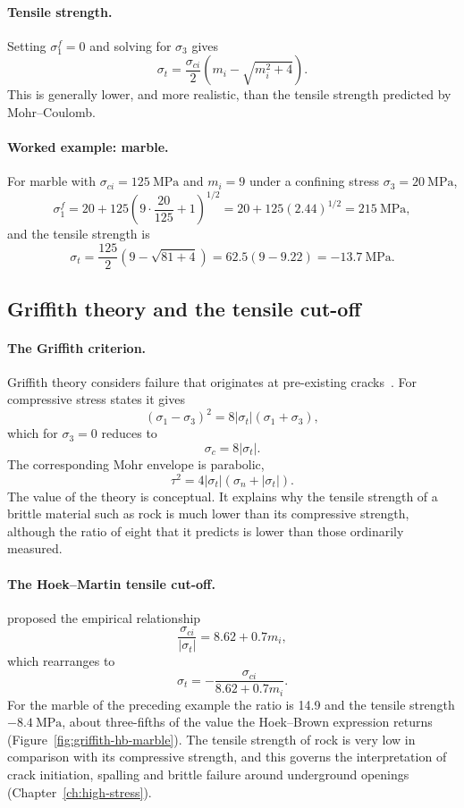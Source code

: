\paragraph{Tensile strength.}
Setting \(\sigma_1^f = 0\) and solving for \(\sigma_3\) gives
\[
\sigma_t =
\frac{\sigma_{ci}}{2}
\left(
m_i - \sqrt{m_i^2+4}
\right) .
\]
This is generally lower, and more realistic, than the tensile strength
predicted by Mohr--Coulomb.

\paragraph{Worked example: marble.}
For marble with \(\sigma_{ci}=125~\text{MPa}\) and \(m_i=9\) under a
confining stress \(\sigma_3=20~\text{MPa}\),
\[
\sigma_1^f =
20 + 125
\left(
9\cdot\frac{20}{125}+1
\right)^{1/2}
=
20 + 125(2.44)^{1/2}
=
215~\text{MPa} ,
\]
and the tensile strength is
\[
\sigma_t =
\frac{125}{2}
\left(
9-\sqrt{81+4}
\right)
=
62.5(9-9.22)
=
-13.7~\text{MPa} .
\]

\subsection{Griffith theory and the tensile cut-off}
\label{sec:griffith-tensile-cutoff}

\paragraph{The Griffith criterion.}
Griffith theory considers failure that originates at pre-existing
cracks~\citep{griffith1921rupture}. For compressive stress states it gives
\[
(\sigma_1-\sigma_3)^2 =
8|\sigma_t|(\sigma_1+\sigma_3) ,
\]
which for \(\sigma_3=0\) reduces to
\[
\sigma_c = 8|\sigma_t| .
\]
The corresponding Mohr envelope is parabolic,
\[
\tau^2 =
4|\sigma_t|(\sigma_n+|\sigma_t|) .
\]
The value of the theory is conceptual. It explains why the tensile strength
of a brittle material such as rock is much lower than its compressive
strength, although the ratio of eight that it predicts is lower than those
ordinarily measured.

\paragraph{The Hoek--Martin tensile cut-off.}
\citet{hoekmartin2014fracture} proposed the empirical relationship
\[
\frac{\sigma_{ci}}{|\sigma_t|}
=
8.62 + 0.7m_i ,
\]
which rearranges to
\[
\sigma_t =
-\frac{\sigma_{ci}}{8.62+0.7m_i} .
\]
For the marble of the preceding example the ratio is 14.9 and the tensile
strength \(-8.4~\text{MPa}\), about three-fifths of the value the Hoek--Brown
expression returns (Figure~\ref{fig:griffith-hb-marble}). The tensile strength of rock is very low in comparison
with its compressive strength, and this governs the interpretation of crack
initiation, spalling and brittle failure around underground openings
(Chapter~\ref{ch:high-stress}).

